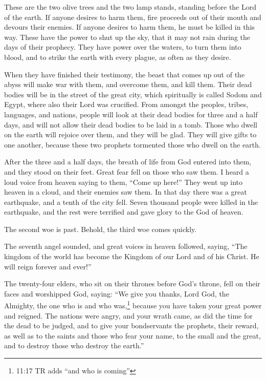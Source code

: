  These are the two olive trees and the two lamp stands,
standing before the Lord of the earth.  If anyone desires to
harm them, fire proceeds out of their mouth and devours their enemies.
If anyone desires to harm them, he must be killed in this way.
 These have the power to shut up the sky, that it may not
rain during the days of their prophecy. They have power over the waters,
to turn them into blood, and to strike the earth with every plague, as
often as they desire.

 When they have finished their testimony, the beast that
comes up out of the abyss will make war with them, and overcome them,
and kill them.  Their dead bodies will be in the street of
the great city, which spiritually is called Sodom and Egypt, where also
their Lord was crucified.  From amongst the peoples, tribes,
languages, and nations, people will look at their dead bodies for three
and a half days, and will not allow their dead bodies to be laid in a
tomb.  Those who dwell on the earth will rejoice over them,
and they will be glad. They will give gifts to one another, because
these two prophets tormented those who dwell on the earth.

 After the three and a half days, the breath of life from
God entered into them, and they stood on their feet. Great fear fell on
those who saw them.  I heard a loud voice from heaven
saying to them, ``Come up here!'' They went up into heaven in a cloud,
and their enemies saw them.  In that day there was a great
earthquake, and a tenth of the city fell. Seven thousand people were
killed in the earthquake, and the rest were terrified and gave glory to
the God of heaven.

 The second woe is past. Behold, the third woe comes
quickly.

 The seventh angel sounded, and great voices in heaven
followed, saying, ``The kingdom of the world has become the Kingdom of
our Lord and of his Christ. He will reign forever and ever!''

 The twenty-four elders, who sit on their thrones before
God's throne, fell on their faces and worshipped God, 
saying: ``We give you thanks, Lord God, the Almighty, the one who is and
who was,\footnote{11:17 TR adds ``and who is coming''} because you have
taken your great power and reigned.  The nations were
angry, and your wrath came, as did the time for the dead to be judged,
and to give your bondservants the prophets, their reward, as well as to
the saints and those who fear your name, to the small and the great, and
to destroy those who destroy the earth.''

